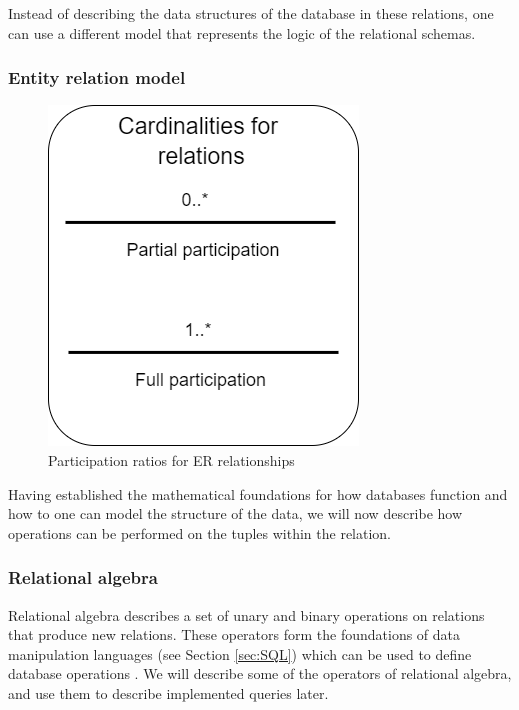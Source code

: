 Instead of describing the data structures of the database in these relations, one can use a different model that represents the logic of the relational schemas.

\subsubsection{Entity relation model}\label{sec:EntityRelationModel}
\begin{figure}
    \centering
    \includegraphics[scale=0.5]{Images/cardinalities.png}
    \caption{Participation ratios for ER relationships}
    \label{fig:ERDiagram_Cardinality}
\end{figure}


Having established the mathematical foundations for how databases function and how to one can model the structure of the data, we will now describe how operations can be performed on the tuples within the relation.

\subsubsection{Relational algebra}\label{sec:relationalAlgebra}
Relational algebra describes a set of unary and binary operations on relations that produce new relations.
These operators form the foundations of data manipulation languages (see Section \ref{sec:SQL}) which can be used to define database operations \cite[Chapter 6.2]{DBSBook}.
We will describe some of the operators of relational algebra, and use them to describe implemented queries later.

